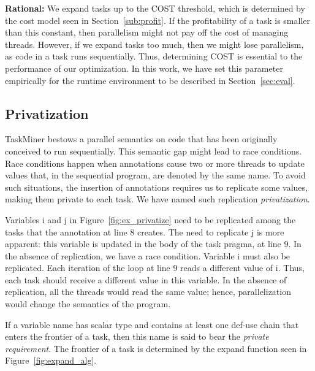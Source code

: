 \documentclass[sigplan,10pt,screen]{acmart}
\newcommand\Taskminer{\mbox{\textsf{TaskMiner}}}
\begin{document}
\noindent
\textbf{Rational:}
We expand tasks up to the \textsf{COST} threshold, which is determined
by the cost model seen in Section~\ref{sub:profit}.
If the profitability of a task is smaller than this constant, then parallelism
might not pay off the cost of managing threads.
However, if we expand tasks too much, then we might lose parallelism,
as code in a task runs sequentially.
Thus, determining \textsf{COST} is essential to the performance of our
optimization.
In this work, we have set this parameter empirically for the
runtime environment to be described in Section~\ref{sec:eval}.

\subsection{Privatization}
\label{sub:variance}

\Taskminer{} bestows a parallel semantics on code that has been originally
conceived to run sequentially.
This semantic gap might lead to race conditions.
Race conditions happen when annotations cause two or more threads to update
values that, in the sequential program, are denoted by the same name.
To avoid such situations, the insertion of annotations requires us to replicate
some values, making them private to each task.
We have named such replication {\em privatization}.

\begin{example}[Privatization]
\label{ex:priv}
Variables \textsf{i} and \textsf{j} in Figure~\ref{fig:ex_privatize} need to be
replicated among the tasks that the annotation at line 8 creates.
The need to replicate \textsf{j} is more apparent: this variable is updated in
the body of the task pragma, at line 9.
In the absence of replication, we have a race condition.
Variable \textsf{i} must also be replicated.
Each iteration of the loop at line 9 reads a different value of \textsf{i}.
Thus, each task should receive a different value in this variable.
In the absence of replication, all the threads would read the same value;  hence,
parallelization would change the semantics of the program.
\end{example}

\begin{definition}
\label{def:private}
If a variable name has scalar type and contains at least one def-use chain that
enters the frontier of a task, then this name is said to bear the {\em private
requirement}.
The frontier of a task is determined by the \textsf{expand} function seen in
Figure~\ref{fig:expand_alg}.
\end{definition}
\end{document}

